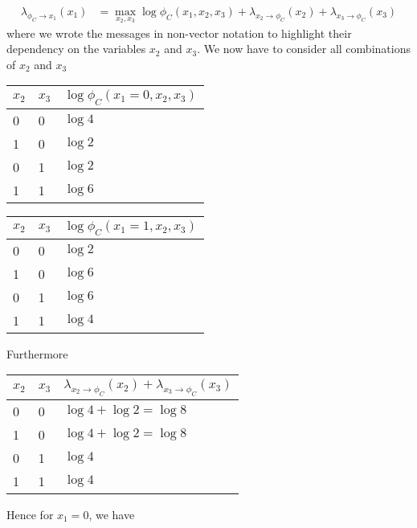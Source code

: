 \begin{exenumerate}
\begin{solution}
\begin{align}
        \lambda_{\phi_C \to x_1}(x_1) & = \max_{x_2, x_3} \log \phi_C(x_1, x_2, x_3) +  \lambda_{x_2 \to \phi_C}(x_2) + \lambda_{x_3 \to \phi_C}(x_3)
      \end{align}
      where we wrote the messages in non-vector notation to highlight
      their dependency on the variables $x_2$ and $x_3$. We now have to consider all combinations of $x_2$ and $x_3$
      \begin{center}
        \begin{tabular}{lll}
          \toprule
          $x_2$ & $x_3$ & $\log \phi_C(x_1=0, x_2, x_3)$\\
          \midrule
          0 & 0 & $\log 4$ \\
          1 & 0 &  $\log 2$\\
          0 & 1 & $\log 2$ \\
          1 & 1 & $\log 6$ \\
          \bottomrule
        \end{tabular}
        \hspace{4ex}
        \begin{tabular}{lll}
          \toprule
          $x_2$ & $x_3$ & $\log \phi_C(x_1=1, x_2, x_3)$\\
          \midrule
          0 & 0 & $\log 2$  \\
          1 & 0 & $\log 6 $ \\
          0 & 1 & $\log 6$  \\
          1 & 1 & $\log 4$ \\
          \bottomrule
        \end{tabular}
       \end{center}
      Furthermore
      \begin{center}
        \begin{tabular}{lll}
          \toprule
          $x_2$ & $x_3$ & $\lambda_{x_2 \to \phi_C}(x_2) + \lambda_{x_3 \to \phi_C}(x_3)$\\
          \midrule
          0 & 0 & $\log 4 + \log 2 = \log 8$  \\
          1 & 0 & $\log 4 + \log 2 = \log 8$\\
          0 & 1 & $\log 4$\\
          1 & 1 & $\log 4$\\
          \bottomrule
        \end{tabular}
      \end{center}
      Hence for $x_1=0$, we have
       \begin{center}
         \begin{tabular}{lll}

\end{tabular}
\end{center}
\end{solution}
\end{exenumerate}
